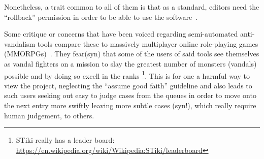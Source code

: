 Nonetheless, a trait common to all of them is that as a standard, editors need the ``rollback'' permission in order to be able to use the software~\cite{HalRied2012}. %

Some critique or concerns that have been voiced regarding semi-automated anti-vandalism tools compare these to massively multiplayer online role-playing games (MMORPGs)~\cite{HalRied2012}.
They fear(syn) that some of the users of said tools see themselves as vandal fighters on a mission to slay the greatest number of monsters (vandals) possible and by doing so excell in the ranks
\footnote{STiki really has a leader board: \url{https://en.wikipedia.org/wiki/Wikipedia:STiki/leaderboard}}.
This is for one a harmful way to view the project, neglecting the ``assume good faith'' guideline %
and also leads to such users seeking out easy to judge cases from the queues in order to move onto the next entry more swiftly
leaving more subtle cases (syn!), which really require human judgement, to others.

